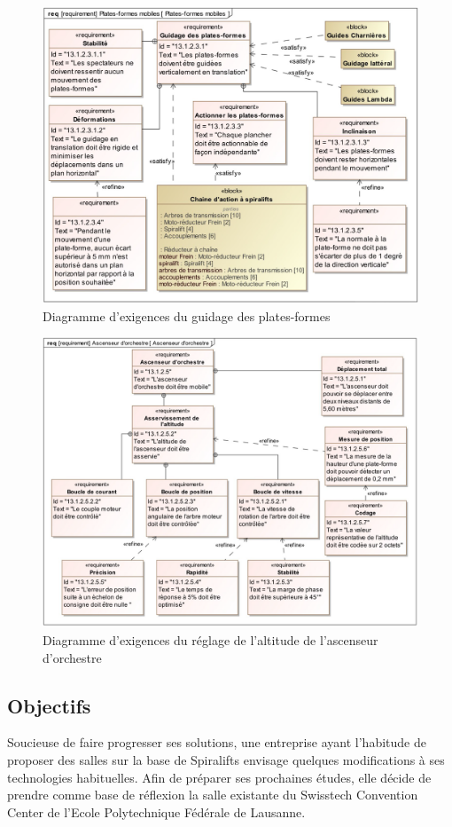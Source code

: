 \begin{figure}[!h]
 \centering\includegraphics[width=0.7\linewidth]{img/fig07}
 \caption{Diagramme d'exigences du guidage des plates-formes}
 \label{fig07}
\end{figure}

\begin{figure}[!h]
 \centering\includegraphics[width=0.7\linewidth]{img/fig08}
 \caption{Diagramme d'exigences du réglage de l'altitude de l'ascenseur d'orchestre}
 \label{fig08}
\end{figure}

\subsection{Objectifs}

Soucieuse de faire progresser ses solutions, une entreprise ayant l'habitude de proposer des salles sur la base de Spiralifts envisage quelques modifications à ses technologies habituelles. Afin de préparer ses prochaines études, elle décide de prendre comme base de réflexion la salle existante du Swisstech Convention Center de l'Ecole Polytechnique Fédérale de Lausanne.

